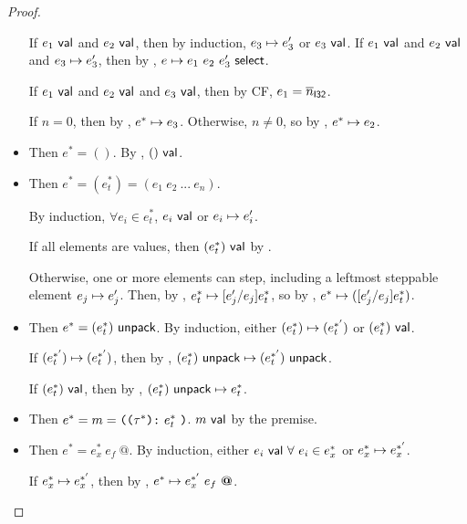 \documentclass{article}
\begin{document}
\begin{proof}
\begin{itemize}
            If $e_1 ~\mathsf{val}$ and $e_2 ~\mathsf{val}$, then by induction, $e_3 \mapsto e_3'$ or $e_3 ~\mathsf{val}$.
            If $e_1 ~\mathsf{val}$ and $e_2 ~\mathsf{val}$ and $e_3 \mapsto e_3'$, then by , $e \mapsto e_1 ~ e_2 ~ e_3' ~ \mathsf{select}$.
            
            If $e_1 ~\mathsf{val}$ and $e_2 ~\mathsf{val}$ and $e_3 ~\mathsf{val}$, then by CF, $e_1 = \overline{n}_{\mathsf{I32}}$.
            
            If $n = 0$, then by , $e^* \mapsto e_3$.
            Otherwise, $n \neq 0$, so by , $e^* \mapsto e_2$.
        
        \item {}
            Then $e^* = ()$. By , $() ~\mathsf{val}$.
        
        \item {}
            Then $e^* = (e^*_t) = (e_1~ e_2~ ...~ e_n)$.
            
            By induction, $\forall e_i \in e^*_t$, $e_i ~\mathsf{val}$ or $e_i \mapsto e_i'$.
            
            If all elements are values, then $(e^*_t) ~\mathsf{val}$ by .
            
            Otherwise, one or more elements can step, including a leftmost steppable element $e_j \mapsto e_j'$.
            Then, by , $e^*_t \mapsto [e_j' / e_j] e^*_t$, so by , $e^* \mapsto ([e_j' / e_j] e^*_t)$.
            
        \item {}
            Then $e^* = (e^*_t) ~ \mathsf{unpack}$.
            By induction, either $(e^*_t) \mapsto (e^{*'}_t)$ or $(e^*_t) ~\mathsf{val}$.
            
            If $(e^{*'}_t) \mapsto (e^{*'}_t)$, then by , $(e^*_t) ~ \mathsf{unpack} \mapsto (e^{*'}_t) ~ \mathsf{unpack}$.
            
            If $(e^*_t) ~\mathsf{val}$, then by , $(e^*_t) ~ \mathsf{unpack} \mapsto e^*_t$.
        
        \item {}
            Then $e^* = m = \texttt{((} \tau^* \texttt{):} ~ e^*_t ~ \texttt{)}$. $m ~\mathsf{val}$ by the premise.
        
        \item {}
            Then $e^* = e^*_x~ e_f~ \textbf{@}$. By induction, either $e_i ~\mathsf{val}~ \forall~ e_i \in e^*_x$ or $e^*_x \mapsto e^{*'}_x$.
            
            If $e^*_x \mapsto e^{*'}_x$, then by , $e^* \mapsto e^{*'}_x~ e_f~ \textbf{@}$.
            

\end{itemize}
\end{proof}
\end{document}
